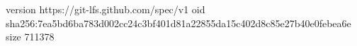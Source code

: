 version https://git-lfs.github.com/spec/v1
oid sha256:7ea5bd6ba783d002cc24c3bf401d81a22855da15c402d8c85e27b40e0febea6e
size 711378

